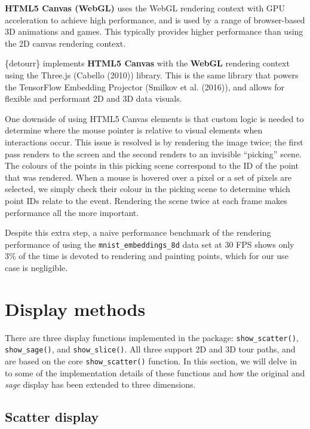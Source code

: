 \textbf{HTML5 Canvas (WebGL)} uses the WebGL rendering context with GPU acceleration to achieve high performance, and is used by a range of browser-based 3D animations and games. This typically provides higher performance than using the 2D canvas rendering context.

\{detourr\} implements \textbf{HTML5 Canvas} with the \textbf{WebGL} rendering context using the Three.js (Cabello (2010)) library. This is the same library that powers the TensorFlow Embedding Projector (Smilkov et al. (2016)), and allows for flexible and performant 2D and 3D data visuals.

One downside of using HTML5 Canvas elements is that custom logic is needed to determine where the mouse pointer is relative to visual elements when interactions occur. This issue is resolved is by rendering the image twice; the first pass renders to the screen and the second renders to an invisible ``picking'' scene. The colours of the points in this picking scene correspond to the ID of the point that was rendered. When a mouse is hovered over a pixel or a set of pixels are selected, we simply check their colour in the picking scene to determine which point IDs relate to the event. Rendering the scene twice at each frame makes performance all the more important.

Despite this extra step, a naive performance benchmark of the rendering performance of  using the \texttt{mnist\_embeddings\_8d} data set at 30 FPS shows only 3\% of the time is devoted to rendering and painting points, which for our use case is negligible.

\hypertarget{display-methods-1}{%
\section{Display methods}\label{display-methods-1}}

There are three display functions implemented in the  package: \texttt{show\_scatter()}, \texttt{show\_sage()}, and \texttt{show\_slice()}. All three support 2D and 3D tour paths, and are based on the core \texttt{show\_scatter()} function. In this section, we will delve in to some of the implementation details of these functions and how the original and \emph{sage} display has been extended to three dimensions.

\hypertarget{scatter-display}{%
\subsection{Scatter display}\label{scatter-display}}


